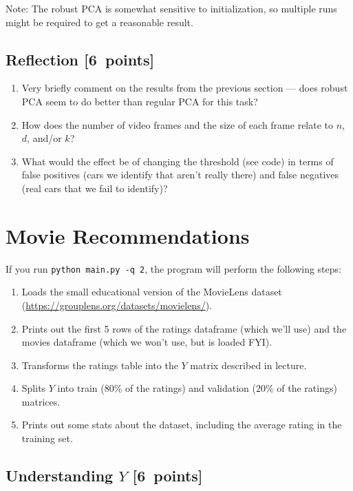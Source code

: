 \documentclass{article}
\newcommand\pts[1]{\textcolor{pointscolour}{[#1~points]}}
\begin{document}
Note: The robust PCA is somewhat sensitive to initialization, so multiple runs might be required to get a reasonable result.



\subsection{Reflection \pts{6}}

\begin{enumerate}
	\item Very briefly comment on the results from the previous section --- does robust PCA seem to do better than regular PCA for this task?
	\item How does the number of video frames and the size of each frame relate to $n$, $d$, and/or $k$?
	\item What would the effect be of changing the threshold (see code) in terms of false positives (cars we identify that aren't really there) and false negatives (real cars that we fail to identify)?
\end{enumerate}


\section{Movie Recommendations}

If you run \texttt{python main.py -q 2}, the program will perform the following steps:

\begin{enumerate}
\item Loads the small educational version of the MovieLens dataset (\url{https://grouplens.org/datasets/movielens/}).
\item Prints out the first 5 rows of the ratings dataframe (which we'll use) and the movies dataframe (which we won't use, but is loaded FYI).
\item Transforms the ratings table into the $Y$ matrix described in lecture.
\item Splits $Y$ into train (80\% of the ratings) and validation (20\% of the ratings) matrices.
\item Prints out some stats about the dataset, including the average rating in the training set.
\end{enumerate}

\subsection{Understanding $Y$ \pts{6}}
\end{document}
